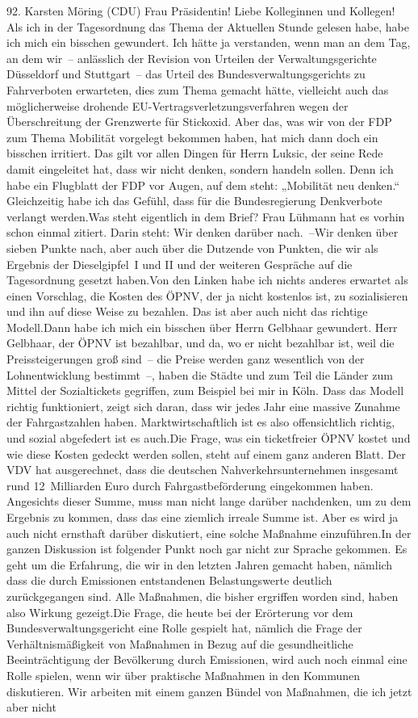 \documentclass{article}
\begin{document}
	92. Karsten Möring (CDU) Frau Präsidentin! Liebe Kolleginnen und Kollegen! Als ich in der Tagesordnung das Thema der Aktuellen Stunde gelesen habe, habe ich mich ein bisschen gewundert. Ich hätte ja verstanden, wenn man an dem Tag, an dem wir – anlässlich der Revision von Urteilen der Verwaltungsgerichte Düsseldorf und Stuttgart – das Urteil des Bundesverwaltungsgerichts zu Fahrverboten erwarteten, dies zum Thema gemacht hätte, vielleicht auch das möglicherweise drohende EU-Vertragsverletzungsverfahren wegen der Überschreitung der Grenzwerte für Stickoxid. Aber das, was wir von der FDP zum Thema Mobilität vorgelegt bekommen haben, hat mich dann doch ein bisschen irritiert. Das gilt vor allen Dingen für Herrn Luksic, der seine Rede damit eingeleitet hat, dass wir nicht denken, sondern handeln sollen. Denn ich habe ein Flugblatt der FDP vor Augen, auf dem steht: „Mobilität neu denken.“ Gleichzeitig habe ich das Gefühl, dass für die Bundesregierung Denkverbote verlangt werden.Was steht eigentlich in dem Brief? Frau Lühmann hat es vorhin schon einmal zitiert. Darin steht: Wir denken darüber nach. –Wir denken über sieben Punkte nach, aber auch über die Dutzende von Punkten, die wir als Ergebnis der Dieselgipfel I und II und der weiteren Gespräche auf die Tagesordnung gesetzt haben.Von den Linken habe ich nichts anderes erwartet als einen Vorschlag, die Kosten des ÖPNV, der ja nicht kostenlos ist, zu sozialisieren und ihn auf diese Weise zu bezahlen. Das ist aber auch nicht das richtige Modell.Dann habe ich mich ein bisschen über Herrn Gelbhaar gewundert. Herr Gelbhaar, der ÖPNV ist bezahlbar, und da, wo er nicht bezahlbar ist, weil die Preissteigerungen groß sind – die Preise werden ganz wesentlich von der Lohnentwicklung bestimmt –, haben die Städte und zum Teil die Länder zum Mittel der Sozialtickets gegriffen, zum Beispiel bei mir in Köln. Dass das Modell richtig funktioniert, zeigt sich daran, dass wir jedes Jahr eine massive Zunahme der Fahrgastzahlen haben. Marktwirtschaftlich ist es also offensichtlich richtig, und sozial abgefedert ist es auch.Die Frage, was ein ticketfreier ÖPNV kostet und wie diese Kosten gedeckt werden sollen, steht auf einem ganz anderen Blatt. Der VDV hat ausgerechnet, dass die deutschen Nahverkehrsunternehmen insgesamt rund 12 Milliarden Euro durch Fahrgastbeförderung eingekommen haben. Angesichts dieser Summe, muss man nicht lange darüber nachdenken, um zu dem Ergebnis zu kommen, dass das eine ziemlich irreale Summe ist. Aber es wird ja auch nicht ernsthaft darüber diskutiert, eine solche Maßnahme einzuführen.In der ganzen Diskussion ist folgender Punkt noch gar nicht zur Sprache gekommen. Es geht um die Erfahrung, die wir in den letzten Jahren gemacht haben, nämlich dass die durch Emissionen entstandenen Belastungswerte deutlich zurückgegangen sind. Alle Maßnahmen, die bisher ergriffen worden sind, haben also Wirkung gezeigt.Die Frage, die heute bei der Erörterung vor dem Bundesverwaltungsgericht eine Rolle gespielt hat, nämlich die Frage der Verhältnismäßigkeit von Maßnahmen in Bezug auf die gesundheitliche Beeinträchtigung der Bevölkerung durch Emissionen, wird auch noch einmal eine Rolle spielen, wenn wir über praktische Maßnahmen in den Kommunen diskutieren. Wir arbeiten mit einem ganzen Bündel von Maßnahmen, die ich jetzt aber nicht 
\end{document}

